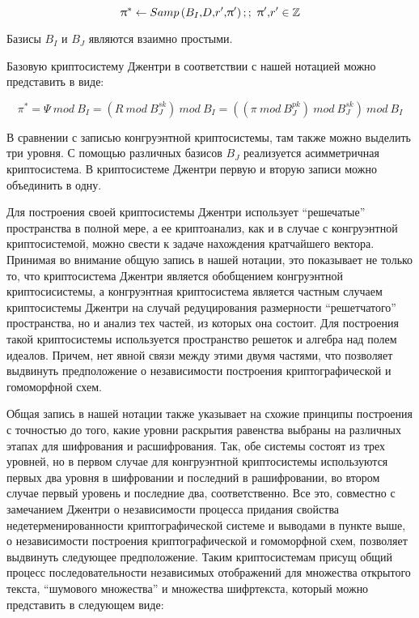     \[{\uppi }^*\leftarrow Samp\left(B_I\textrm{,} D\textrm{,} r'\textrm{,} {\uppi}'\right);;\ {\uppi }'\textrm{,} r'\in {\mathbb Z}\] 
    
    Базисы $B_I$ и $B_J$ являются взаимно простыми.
    
    Базовую криптосистему Джентри в соответствии с нашей нотацией можно представить в виде:\textit{}
    
    \[{\pi }^*=\Psi ~mod\ B_I=\left(R~mod\ B^{sk}_J\right)~mod\ B_I=\left(\left(\pi ~mod\ B^{pk}_J\right)~mod\ B^{sk}_J\right)~mod\ B_I\] 
    
    В сравнении с записью конгруэнтной криптосистемы, там также можно выделить три уровня. С помощью различных базисов $B_J$ реализуется асимметричная криптосистема. В криптосистеме Джентри первую и вторую записи можно объединить в одну.
    
    Для построения своей криптосистемы Джентри использует ``решечатые'' пространства в полной мере, а ее криптоанализ, как и в случае с конгруэнтной криптосистемой, можно свести к задаче нахождения кратчайшего вектора. Принимая во внимание общую запись в нашей нотации, это показывает не только то, что криптосистема Джентри является обобщением конгруэнтной криптосисистемы, а конгруэнтная криптосистема является частным случаем криптосистемы Джентри на случай редуцирования размерности ``решетчатого'' пространства, но и анализ тех частей, из которых она состоит. Для построения такой криптосистемы используется пространство решеток и алгебра над полем идеалов. Причем, нет явной связи между этими двумя частями, что позволяет выдвинуть предположение о независимости построения криптографической и гомоморфной схем.
    
    \textbf{ }Общая запись в нашей нотации также указывает на схожие принципы построения с точностью до того, какие уровни раскрытия равенства выбраны на различных этапах для шифрования и расшифрования. Так, обе системы состоят из трех уровней, но в первом случае для конгруэнтной криптосистемы используются первых два уровня в шифровании и последний в рашифровании, во втором случае первый уровень и последние два, соответственно. Все это, совместно с замечанием Джентри о независимости процесса придания свойства недетерменированности криптографической системе и выводами в пункте выше, о независимости построения криптографической и гомоморфной схем, позволяет выдвинуть следующее предположение. Таким криптосистемам присущ общий процесс последовательности независимых отображений для множества открытого текста, ``шумового множества'' и множества шифртекста, который можно представить в следующем виде:
    
